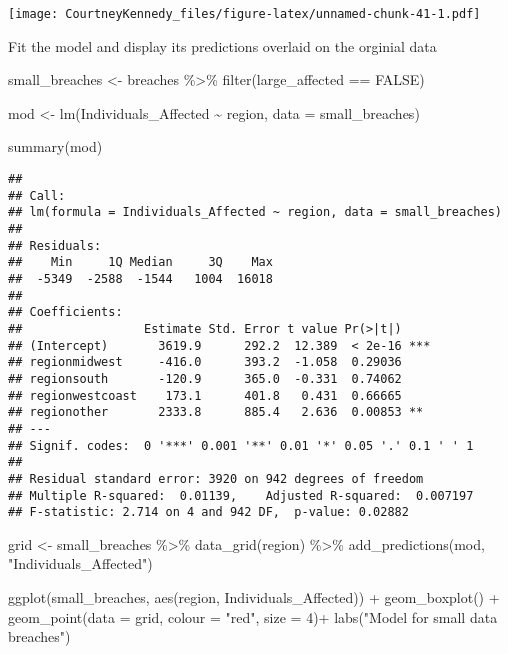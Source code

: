 \documentclass[
]{article}
\newenvironment{Shaded}{\begin{snugshade}}{\end{snugshade}}
\newcommand{\AttributeTok}[1]{\textcolor[rgb]{0.77,0.63,0.00}{#1}}
\newcommand{\ConstantTok}[1]{\textcolor[rgb]{0.00,0.00,0.00}{#1}}
\newcommand{\DecValTok}[1]{\textcolor[rgb]{0.00,0.00,0.81}{#1}}
\newcommand{\FunctionTok}[1]{\textcolor[rgb]{0.00,0.00,0.00}{#1}}
\newcommand{\NormalTok}[1]{#1}
\newcommand{\OtherTok}[1]{\textcolor[rgb]{0.56,0.35,0.01}{#1}}
\newcommand{\SpecialCharTok}[1]{\textcolor[rgb]{0.00,0.00,0.00}{#1}}
\newcommand{\StringTok}[1]{\textcolor[rgb]{0.31,0.60,0.02}{#1}}
\begin{document}
\texttt{[image: CourtneyKennedy\_files/figure-latex/unnamed-chunk-41-1.pdf]}

Fit the model and display its predictions overlaid on the orginial data

\begin{Shaded}
\begin{Highlighting}[]
\NormalTok{small\_breaches }\OtherTok{\textless{}{-}}\NormalTok{ breaches }\SpecialCharTok{\%\textgreater{}\%}
  \FunctionTok{filter}\NormalTok{(large\_affected }\SpecialCharTok{==} \ConstantTok{FALSE}\NormalTok{)}

\NormalTok{mod }\OtherTok{\textless{}{-}} \FunctionTok{lm}\NormalTok{(Individuals\_Affected }\SpecialCharTok{\textasciitilde{}}\NormalTok{ region, }\AttributeTok{data =}\NormalTok{ small\_breaches)}

\FunctionTok{summary}\NormalTok{(mod)}
\end{Highlighting}
\end{Shaded}

\begin{verbatim}
## 
## Call:
## lm(formula = Individuals_Affected ~ region, data = small_breaches)
## 
## Residuals:
##    Min     1Q Median     3Q    Max 
##  -5349  -2588  -1544   1004  16018 
## 
## Coefficients:
##                 Estimate Std. Error t value Pr(>|t|)    
## (Intercept)       3619.9      292.2  12.389  < 2e-16 ***
## regionmidwest     -416.0      393.2  -1.058  0.29036    
## regionsouth       -120.9      365.0  -0.331  0.74062    
## regionwestcoast    173.1      401.8   0.431  0.66665    
## regionother       2333.8      885.4   2.636  0.00853 ** 
## ---
## Signif. codes:  0 '***' 0.001 '**' 0.01 '*' 0.05 '.' 0.1 ' ' 1
## 
## Residual standard error: 3920 on 942 degrees of freedom
## Multiple R-squared:  0.01139,    Adjusted R-squared:  0.007197 
## F-statistic: 2.714 on 4 and 942 DF,  p-value: 0.02882
\end{verbatim}

\begin{Shaded}
\begin{Highlighting}[]
\NormalTok{grid }\OtherTok{\textless{}{-}}\NormalTok{ small\_breaches }\SpecialCharTok{\%\textgreater{}\%}
  \FunctionTok{data\_grid}\NormalTok{(region) }\SpecialCharTok{\%\textgreater{}\%}
  \FunctionTok{add\_predictions}\NormalTok{(mod, }\StringTok{"Individuals\_Affected"}\NormalTok{)}

\FunctionTok{ggplot}\NormalTok{(small\_breaches, }\FunctionTok{aes}\NormalTok{(region, Individuals\_Affected)) }\SpecialCharTok{+}
  \FunctionTok{geom\_boxplot}\NormalTok{() }\SpecialCharTok{+}
  \FunctionTok{geom\_point}\NormalTok{(}\AttributeTok{data =}\NormalTok{ grid, }\AttributeTok{colour =} \StringTok{"red"}\NormalTok{, }\AttributeTok{size =} \DecValTok{4}\NormalTok{)}\SpecialCharTok{+}
  \FunctionTok{labs}\NormalTok{(}\StringTok{"Model for small data breaches"}\NormalTok{)}
\end{Highlighting}
\end{Shaded}
\end{document}

